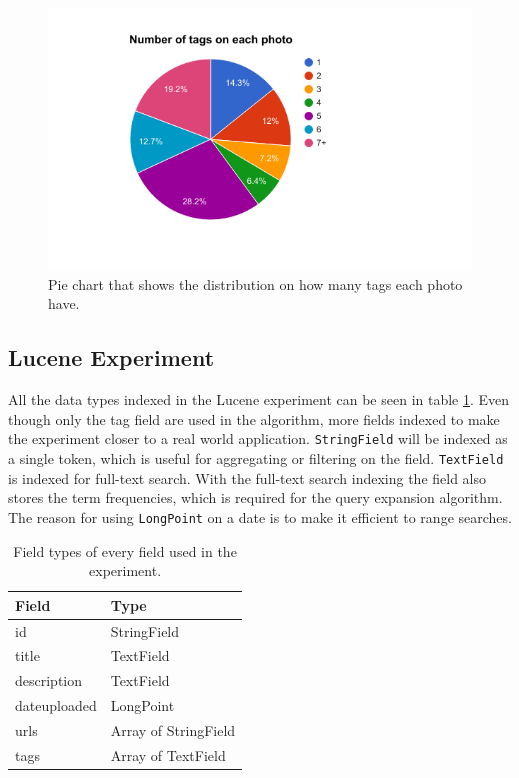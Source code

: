 \begin{figure}[h!]
  \centering \includegraphics[width=1\linewidth]{img/number-of-tags-distribution.png}
  \caption{Pie chart that shows the distribution on how many tags each photo have.}
  \label{fig:pie-chart-tag-distribution}
\end{figure}

\subsection{Lucene Experiment}
All the data types indexed in the Lucene experiment can be seen in table \ref{tbl:lucene-field-types}.
Even though only the tag field are used in the algorithm,
more fields indexed to make the experiment closer to a real world application.
\texttt{StringField} will be indexed as a single token,
which is useful for aggregating or filtering on the field.
\texttt{TextField} is indexed for full-text search.
With the full-text search indexing the field also stores the term frequencies,
which is required for the query expansion algorithm.
The reason for using \texttt{LongPoint} on a date is to make it efficient to range searches.

\begin{table}[h!]
    \begin{tabular}{|l|l|}
    \hline
    \textbf{Field} & \textbf{Type}      \\ \hline
    id           & StringField          \\ \hline
    title        & TextField            \\ \hline
    description  & TextField            \\ \hline
    dateuploaded & LongPoint            \\ \hline
    urls         & Array of StringField \\ \hline
    tags         & Array of TextField   \\ \hline
    \end{tabular}
    \centering
    \caption{Field types of every field used in the experiment.}
    \label{tbl:lucene-field-types}
\end{table}

